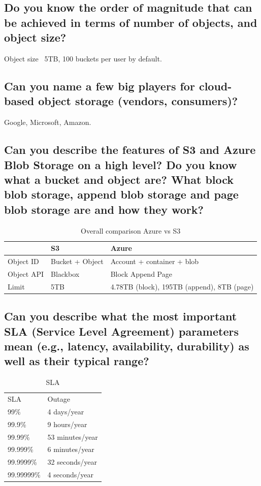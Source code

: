 \documentclass{article}
\begin{document}
\subsection{Do you know the order of magnitude that can be achieved in terms of number of objects, and object size?}

Object size ~5TB, 100 buckets per user by default.

\subsection{Can you name a few big players for cloud-based object storage (vendors, consumers)?}

Google, Microsoft, Amazon.

\subsection{Can you describe the features of S3 and Azure Blob Storage on a high level? Do you know what a bucket and object are? What block blob storage, append blob storage and page blob storage are and how they work?}

\begin{table}
  \centering
  \begin{tabular}{lll}
    \toprule
    & S3 & Azure \\
    \midrule
    Object ID & Bucket + Object & Account + container + blob \\
    Object API & Blackbox & Block Append Page \\
    Limit & 5TB & 4.78TB (block), 195TB (append), 8TB (page)\\
    \bottomrule
  \end{tabular}
  \caption{Overall comparison Azure vs S3}
  \label{tab:azurevss3}
\end{table}


\subsection{Can you describe what the most important SLA (Service Level Agreement) parameters mean (e.g., latency, availability, durability) as well as their typical range?}

\begin{table}
  \centering
  \begin{tabular}{ll}
    \toprule
    SLA & Outage \\
    99\% & 4 days/year\\
    99.9\% & 9 hours/year\\
    99.99\% & 53 minutes/year\\
    99.999\% & 6 minutes/year\\
    99.9999\% & 32 seconds/year\\
    99.99999\% & 4 seconds/year\\
    \bottomrule
  \end{tabular}
  \label{tab:sla}
  \caption{SLA}
\end{table}
\end{document}
